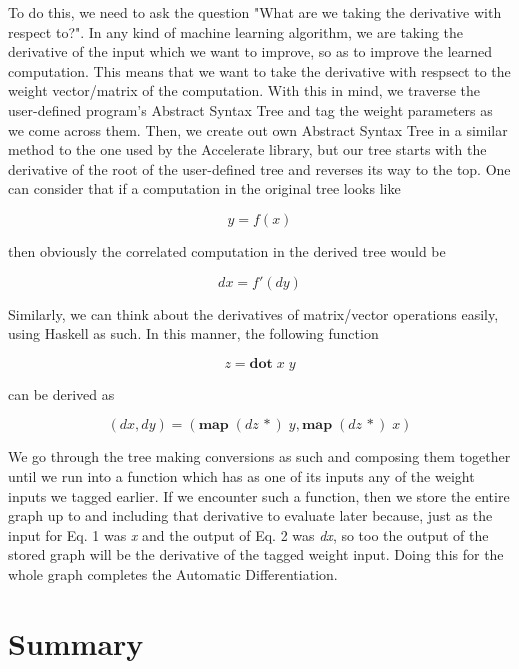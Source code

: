 \documentclass[prodmode,acmtecs]{acmsmall} %
\begin{document}
To do this, we need to ask the question "What are we taking the derivative with respect to?".
In any kind of machine learning algorithm, we are taking the derivative of the input which
we want to improve, so as to improve the learned computation. This means that we want to take
the derivative with respsect to the weight vector/matrix of the computation. With this in
mind, we traverse the user-defined program's Abstract Syntax Tree and tag the weight
parameters as we come across them. Then, we create out own Abstract Syntax Tree in a similar
method to the one used by the Accelerate library, but our tree starts with the derivative
of the root of the user-defined tree and reverses its way to the top. One can consider
that if a computation in the original tree looks like

\begin{equation}
\label{eqn:01}
y = f(x)
\end{equation}

then obviously the correlated computation in the derived tree would be

\begin{equation}
\label{eqn:02}
dx = f'(dy)
\end{equation}

Similarly, we can think about the derivatives of matrix/vector operations easily, using
Haskell as such. In this manner, the following function

\begin{equation}
\label{eqn:03}
z = \textbf{dot} \; x \; y
\end{equation}

can be derived as

\begin{equation}
\label{eqn:04}
(dx,dy) = (\textbf{map} \; (dz \, *) \; y, \textbf{map} \; (dz \, *) \; x)
\end{equation}

We go through the tree making conversions as such and composing them together until we run
into a function which has as one of its inputs any of the weight inputs we tagged earlier.
If we encounter such a function, then we store the entire graph up to and including that
derivative to evaluate later because, just as the input for Eq. 1 was \emph{x}
and the output of Eq. 2 was \emph{dx}, so too the output of the stored graph will be the
derivative of the tagged weight input. Doing this for the whole graph completes the
Automatic Differentiation.

\section{Summary}
\end{document}
